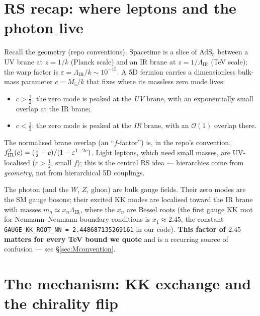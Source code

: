 \documentclass[11pt]{article}
\newcommand{\LIR}{\Lambda_{\mathrm{IR}}}
\newcommand{\half}{\tfrac{1}{2}}
\newcommand{\eps}{\varepsilon}
\newcommand{\code}[1]{\texttt{#1}}
\theoremstyle{definition}
\begin{document}
\section{RS recap: where leptons and the photon live}
\label{sec:rsrecap}

Recall the geometry (repo conventions). Spacetime is a slice of AdS$_5$ between a
UV brane at $z=1/k$ (Planck scale) and an IR brane at $z=1/\LIR$ (TeV scale); the
warp factor is $\eps=\LIR/k\sim10^{-15}$. A 5D fermion carries a dimensionless
bulk-mass parameter $c=M_5/k$ that fixes where its massless zero mode lives:
\begin{itemize}[leftmargin=1.4em]
\item $c>\half$: the zero mode is peaked at the \emph{UV} brane, with an
exponentially small overlap at the IR brane;
\item $c<\half$: the zero mode is peaked at the \emph{IR} brane, with an
$\mathcal{O}(1)$ overlap there.
\end{itemize}
The normalised brane overlap (an ``$f$-factor'') is, in the repo's convention,
$f_{\rm IR}^2(c)=(\half-c)/(1-\eps^{1-2c})$. Light leptons, which need small
masses, are UV-localised ($c>\half$, small $f$); this is the central RS idea ---
hierarchies come from \emph{geometry}, not from hierarchical 5D couplings.

The photon (and the $W$, $Z$, gluon) are bulk gauge fields. Their zero modes are
the SM gauge bosons; their excited KK modes are localised toward the IR brane
with masses $m_n \simeq x_n\LIR$, where the $x_n$ are Bessel roots
(the first gauge KK root for Neumann--Neumann boundary conditions is
$x_1\approx 2.45$, the constant \code{GAUGE\_KK\_ROOT\_NN = 2.448687135269161}
in our code). \textbf{This factor of $2.45$ matters for every TeV bound we quote}
and is a recurring source of confusion --- see \S\ref{sec:Mconvention}.

\section{The mechanism: KK exchange and the chirality flip}
\label{sec:mechanism}
\end{document}
